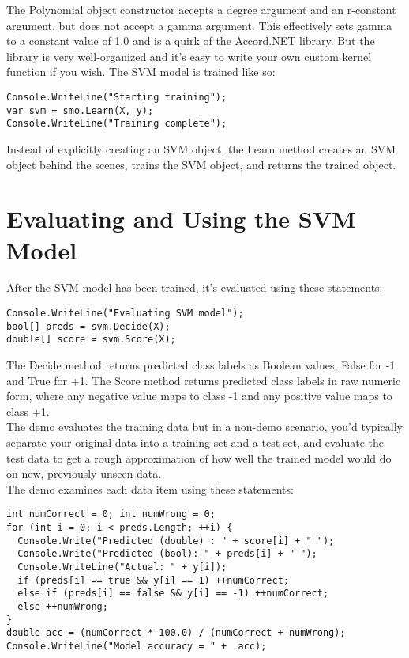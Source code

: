 \documentclass[13pt]{article}
\begin{document}
\noindent
The Polynomial object constructor accepts a degree argument and an r-constant argument, but does not accept a gamma argument. This effectively sets gamma to a constant value of 1.0 and is a quirk of the Accord.NET library. But the library is very well-organized and it's easy to write your own custom kernel function if you wish. The SVM model is trained like so:

\begin{verbatim}
Console.WriteLine("Starting training");
var svm = smo.Learn(X, y);
Console.WriteLine("Training complete");
\end{verbatim}

\noindent
Instead of explicitly creating an SVM object, the Learn method creates an SVM object behind the scenes, trains the SVM object, and returns the trained object.

\section{Evaluating and Using the SVM Model}

After the SVM model has been trained, it's evaluated using these statements:

\begin{verbatim}
Console.WriteLine("Evaluating SVM model");
bool[] preds = svm.Decide(X);
double[] score = svm.Score(X);
\end{verbatim}

The Decide method returns predicted class labels as Boolean values, False for -1 and True for +1. The Score method returns predicted class labels in raw numeric form, where any negative value maps to class -1 and any positive value maps to class +1.\\

\noindent
The demo evaluates the training data but in a non-demo scenario, you'd typically separate your original data into a training set and a test set, and evaluate the test data to get a rough approximation of how well the trained model would do on new, previously unseen data.\\

\noindent
The demo examines each data item using these statements:

\begin{verbatim}
int numCorrect = 0; int numWrong = 0;
for (int i = 0; i < preds.Length; ++i) {
  Console.Write("Predicted (double) : " + score[i] + " ");
  Console.Write("Predicted (bool): " + preds[i] + " ");
  Console.WriteLine("Actual: " + y[i]);
  if (preds[i] == true && y[i] == 1) ++numCorrect;
  else if (preds[i] == false && y[i] == -1) ++numCorrect;
  else ++numWrong;
}  
double acc = (numCorrect * 100.0) / (numCorrect + numWrong);
Console.WriteLine("Model accuracy = " +  acc);
\end{verbatim}
\end{document}
